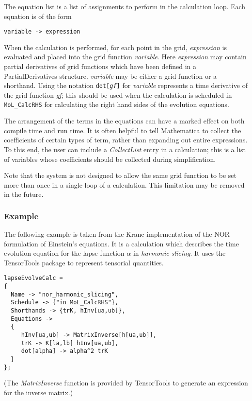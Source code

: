 \documentclass{report}
\begin{document}
The equation list is a list of assignments to perform in the
calculation loop.  Each equation is of the form
\begin{center}
\begin{minipage}{0.8 \textwidth}
\begin{verbatim}
variable -> expression
\end{verbatim}
\end{minipage}
\end{center}
When the calculation is performed, for each point in the grid, {\it
expression} is evaluated and placed into the grid function {\it
variable}.  Here {\it expression} may contain partial derivatives of
grid functions which have been defined in a PartialDerivatives
structure.  {\it variable} may be either a grid function or a
shorthand.  Using the notation {\tt dot[{\it gf}]} for {\it variable}
represents a time derivative of the grid function {\it gf}; this
should be used when the calculation is scheduled in {\tt MoL\_CalcRHS}
for calculating the right hand sides of the evolution equations.

The arrangement of the terms in the equations can have a marked effect
on both compile time and run time.  It is often helpful to tell
Mathematica to collect the coefficients of certain types of term,
rather than expanding out entire expressions.  To this end, the user
can include a {\em CollectList} entry in a calculation; this is a list
of variables whose coefficients should be collected during
simplification.

Note that the system is not designed to allow the same grid function
to be set more than once in a single loop of a calculation.  This
limitation may be removed in the future.

\subsubsection{Example}

The following example is taken from the Kranc implementation of the
NOR formulation of Einstein's equations.  It is a calculation which
describes the time evolution equation for the lapse function $\alpha$
in {\em harmonic slicing}.  It uses the TensorTools package to
represent tensorial quantities.

\begin{center}
\begin{minipage}{0.8 \textwidth}
\begin{verbatim}
lapseEvolveCalc = 
{
  Name -> "nor_harmonic_slicing",
  Schedule -> {"in MoL_CalcRHS"},
  Shorthands -> {trK, hInv[ua,ub]},
  Equations -> 
  {
     hInv[ua,ub] -> MatrixInverse[h[ua,ub]],
     trK -> K[la,lb] hInv[ua,ub],
     dot[alpha] -> alpha^2 trK
  }
};
\end{verbatim}
\end{minipage}
\end{center}
(The {\it MatrixInverse} function is provided by TensorTools to
generate an expression for the inverse matrix.)
\end{document}
